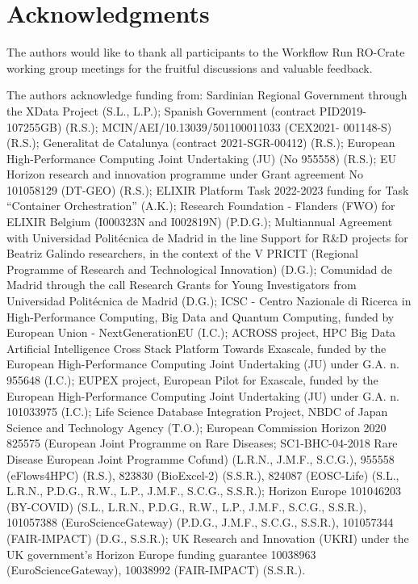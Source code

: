 \documentclass[10pt,letterpaper]{article}
\begin{document}
\section*{Acknowledgments}

The authors would like to thank all participants to the Workflow Run
RO-Crate working group meetings for the fruitful discussions and
valuable feedback.

The authors acknowledge funding from: 
  Sardinian Regional Government through the XData Project (S.L., L.P.);
  Spanish Government (contract PID2019-107255GB) (R.S.);
  MCIN/AEI/10.13039/501100011033 (CEX2021- 001148-S) (R.S.);
  Generalitat de Catalunya (contract 2021-SGR-00412) (R.S.);
  European High-Performance Computing Joint Undertaking (JU) (No 955558) (R.S.);
  EU Horizon research and innovation programme under Grant agreement No 101058129 (DT-GEO) (R.S.);
  ELIXIR Platform Task 2022-2023 funding for Task ``Container
  Orchestration'' (A.K.);
  Research Foundation - Flanders (FWO) for ELIXIR Belgium (I000323N and I002819N) (P.D.G.);
  Multiannual Agreement with Universidad Politécnica de Madrid in the line Support for R\&D projects for Beatriz Galindo researchers, in the context of the V PRICIT (Regional Programme of Research and Technological Innovation) (D.G.);
  Comunidad de Madrid through the call Research Grants for Young Investigators from Universidad Politécnica de Madrid (D.G.);
  ICSC - Centro Nazionale di Ricerca in High-Performance Computing, Big Data and Quantum Computing, funded by European Union - NextGenerationEU (I.C.);
  ACROSS project, HPC Big Data Artificial Intelligence Cross Stack Platform Towards Exascale, funded by the European High-Performance Computing Joint Undertaking (JU) under G.A. n. 955648 (I.C.);
  EUPEX project, European Pilot for Exascale, funded by the European High-Performance Computing Joint Undertaking (JU) under G.A. n. 101033975 (I.C.);
  Life Science Database Integration Project, NBDC of Japan Science and
  Technology Agency (T.O.);
  European Commission Horizon 2020 
  825575 (European Joint Programme on Rare Diseases; SC1-BHC-04-2018 Rare Disease European Joint Programme Cofund) (L.R.N., J.M.F., S.C.G.),
  955558 (eFlows4HPC) (R.S.),
  823830
  (BioExcel-2) (S.S.R.), 
  824087
  (EOSC-Life) (S.L., L.R.N., P.D.G., R.W., L.P., J.M.F., S.C.G., S.S.R.);
  Horizon Europe 
  101046203 (BY-COVID) (S.L., L.R.N., P.D.G., R.W., L.P., J.M.F., S.C.G., S.S.R.),
  101057388 (EuroScienceGateway) (P.D.G., J.M.F., S.C.G., S.S.R.),
  101057344 (FAIR-IMPACT) (D.G., S.S.R.);
  UK Research and Innovation (UKRI) under the UK government's Horizon
  Europe funding guarantee 
  10038963 (EuroScienceGateway), 
  10038992 (FAIR-IMPACT) (S.S.R.).
\end{document}
